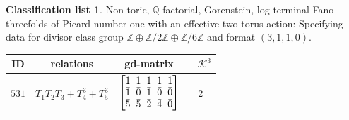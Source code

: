 \documentclass[pdftex]{sigma}%
\theoremstyle{definition}
\newtheorem{class-list}[thm]{Classification list}
\def\ZZ{{\mathbb Z}}
\def\QQ{{\mathbb Q}}
\numberwithin{equation}{section}
\begin{document}
\begin{class-list}\label{class-list(0,2,6)}
Non-toric, $\QQ$-factorial, Gorenstein, log terminal Fano
threefolds of Picard number one with an effective two-torus action:
Specifying data for divisor class group
$\ZZ\oplus \ZZ/2\ZZ\oplus \ZZ/6\ZZ$ and format $(3,1,1,0)$.
\begin{table}[h!]\centering\setlength{\tabcolsep}{5.5pt}
\renewcommand{\arraystretch}{1.1}\small\tabulinesep=1mm
\begin{tabu}{c|c|c|c}
\hline
ID&relations&gd-matrix&$-\mathcal{K}^3$
\\
\hline
${531}$&${T_{1}T_{2}T_{3}+T_{4}^{3}+T_{5}^{3}}$
&$\arraycolsep=1mm\begin{bmatrix}{1} & {1} & {1} & {1} & {1} \\ {\bar{1}} & {\bar{0}} & {\bar{1}} & {\bar{0}} & {\bar{0}} \\ {\bar{5}} & {\bar{5}} & {\bar{2}} & {\bar{4}} & {\bar{0}}\end{bmatrix}$
&${2}$
\\
\hline
\end{tabu}%
\end{table}
\end{class-list}
\end{document}
